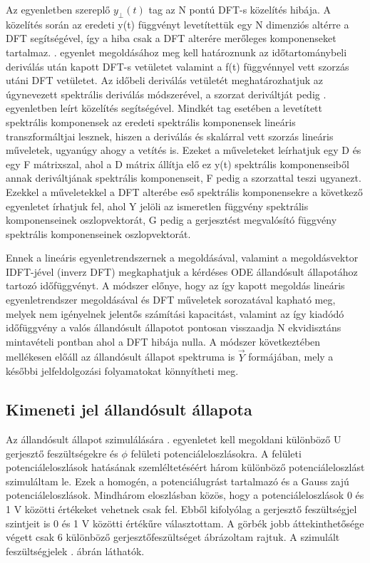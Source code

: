 Az egyenletben szereplő $y_\perp(t)$ tag az N pontú DFT-s közelítés hibája. A közelítés során az eredeti y(t) függvényt levetítettük egy N dimenziós altérre a DFT segítségével, így a hiba csak a DFT alterére merőleges komponenseket tartalmaz. . egyenlet megoldásához meg kell határoznunk az időtartománybeli deriválás után kapott DFT-s vetületet valamint a f(t) függvénnyel vett szorzás utáni DFT vetületet. Az időbeli deriválás vetületét meghatározhatjuk az úgynevezett spektrális deriválás módszerével\cite{FFT_deriv}, a szorzat deriváltját pedig . egyenletben leírt közelítés segítségével. Mindkét tag esetében a levetített spektrális komponensek az eredeti spektrális komponensek lineáris transzformáltjai lesznek, hiszen a deriválás és skalárral vett szorzás lineáris műveletek, ugyanúgy ahogy a vetítés is. Ezeket a műveleteket leírhatjuk egy D és egy F mátrixszal, ahol a D mátrix állítja elő ez y(t) spektrális komponenseiből annak deriváltjának spektrális komponenseit, F pedig a szorzattal teszi ugyanezt. Ezekkel a műveletekkel a DFT alterébe eső spektrális komponensekre a következő egyenletet írhatjuk fel, ahol Y jelöli az ismeretlen függvény spektrális komponenseinek oszlopvektorát, G pedig a gerjesztést megvalósító függvény spektrális komponenseinek oszlopvektorát.


Ennek a lineáris egyenletrendszernek a megoldásával, valamint a megoldásvektor IDFT-jével (inverz DFT) megkaphatjuk a kérdéses ODE állandósult állapotához tartozó időfüggvényt. A módszer előnye, hogy az így kapott megoldás lineáris egyenletrendszer megoldásával és DFT műveletek sorozatával kapható meg, melyek nem igényelnek jelentős számítási kapacitást, valamint az így kiadódó időfüggvény a valós állandósult állapotot pontosan visszaadja N ekvidisztáns mintavételi pontban ahol a DFT hibája nulla. A módszer következtében mellékesen előáll az állandósult állapot spektruma is $\vec{Y}$ formájában, mely a későbbi jelfeldolgozási folyamatokat könnyítheti meg.

\subsection{Kimeneti jel állandósult állapota}
\label{chap:ss}

Az állandósult állapot szimulálására . egyenletet kell megoldani különböző U gerjesztő feszültségekre és $\phi$ felületi potenciáleloszlásokra. A felületi potenciáleloszlások hatásának szemléltetéséért három különböző potenciáleloszlást szimuláltam le. Ezek a homogén, a potenciálugrást tartalmazó és a Gauss zajú potenciáleloszlások. Mindhárom eloszlásban közös, hogy a potenciáleloszlások 0 és 1 V közötti értékeket vehetnek csak fel. Ebből kifolyólag a gerjesztő feszültségjel szintjeit is 0 és 1 V közötti értékűre választottam. A görbék jobb áttekinthetősége végett csak 6 különböző gerjesztőfeszültséget ábrázoltam rajtuk. A szimulált feszültségjelek . ábrán láthatók.


